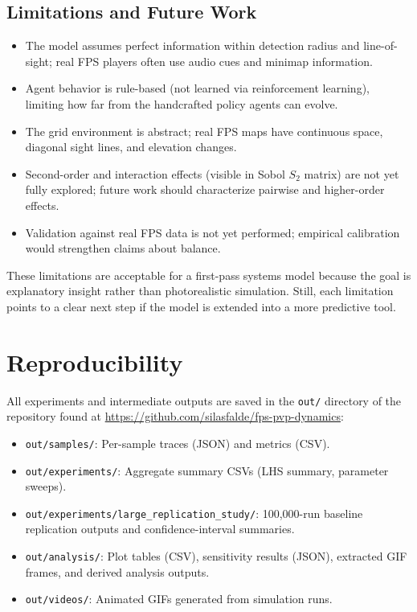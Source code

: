 \documentclass{assignment}
\begin{document}
\subsection{Limitations and Future Work}

\begin{itemize}
  \item The model assumes perfect information within detection radius and line-of-sight; real FPS players often use audio cues and minimap information.
  \item Agent behavior is rule-based (not learned via reinforcement learning), limiting how far from the handcrafted policy agents can evolve.
  \item The grid environment is abstract; real FPS maps have continuous space, diagonal sight lines, and elevation changes.
  \item Second-order and interaction effects (visible in Sobol $S_2$ matrix) are not yet fully explored; future work should characterize pairwise and higher-order effects.
  \item Validation against real FPS data is not yet performed; empirical calibration would strengthen claims about balance.
\end{itemize}

These limitations are acceptable for a first-pass systems model because the goal is explanatory insight rather than photorealistic simulation. Still, each limitation points to a clear next step if the model is extended into a more predictive tool.

\section{Reproducibility}

All experiments and intermediate outputs are saved in the \texttt{out/} directory of the repository found at \url{https://github.com/silasfalde/fps-pvp-dynamics}:
\begin{itemize}
  \item \texttt{out/samples/}: Per-sample traces (JSON) and metrics (CSV).
  \item \texttt{out/experiments/}: Aggregate summary CSVs (LHS summary, parameter sweeps).
  \item \texttt{out/experiments/large\_replication\_study/}: 100,000-run baseline replication outputs and confidence-interval summaries.
  \item \texttt{out/analysis/}: Plot tables (CSV), sensitivity results (JSON), extracted GIF frames, and derived analysis outputs.
  \item \texttt{out/videos/}: Animated GIFs generated from simulation runs.
\end{itemize}
\end{document}
